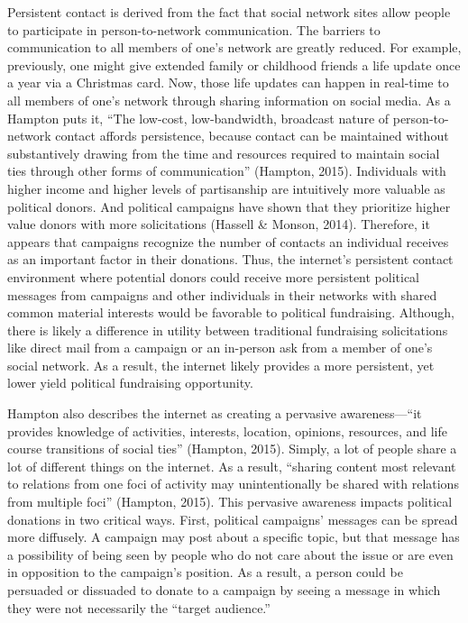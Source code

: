 \documentclass[12pt,]{article}
\begin{document}
Persistent contact is derived from the fact that social network sites
allow people to participate in person-to-network communication. The
barriers to communication to all members of one's network are greatly
reduced. For example, previously, one might give extended family or
childhood friends a life update once a year via a Christmas card. Now,
those life updates can happen in real-time to all members of one's
network through sharing information on social media. As a Hampton puts
it, ``The low-cost, low-bandwidth, broadcast nature of person-to-network
contact affords persistence, because contact can be maintained without
substantively drawing from the time and resources required to maintain
social ties through other forms of communication'' (Hampton, 2015).
Individuals with higher income and higher levels of partisanship are
intuitively more valuable as political donors. And political campaigns
have shown that they prioritize higher value donors with more
solicitations (Hassell \& Monson, 2014). Therefore, it appears that
campaigns recognize the number of contacts an individual receives as an
important factor in their donations. Thus, the internet's persistent
contact environment where potential donors could receive more persistent
political messages from campaigns and other individuals in their
networks with shared common material interests would be favorable to
political fundraising. Although, there is likely a difference in utility
between traditional fundraising solicitations like direct mail from a
campaign or an in-person ask from a member of one's social network. As a
result, the internet likely provides a more persistent, yet lower yield
political fundraising opportunity.

Hampton also describes the internet as creating a pervasive
awareness---``it provides knowledge of activities, interests, location,
opinions, resources, and life course transitions of social ties''
(Hampton, 2015). Simply, a lot of people share a lot of different things
on the internet. As a result, ``sharing content most relevant to
relations from one foci of activity may unintentionally be shared with
relations from multiple foci'' (Hampton, 2015). This pervasive awareness
impacts political donations in two critical ways. First, political
campaigns' messages can be spread more diffusely. A campaign may post
about a specific topic, but that message has a possibility of being seen
by people who do not care about the issue or are even in opposition to
the campaign's position. As a result, a person could be persuaded or
dissuaded to donate to a campaign by seeing a message in which they were
not necessarily the ``target audience.''
\end{document}
